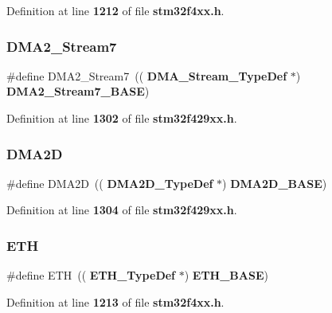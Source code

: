 Definition at line \textbf{ 1212} of file \textbf{ stm32f4xx.\+h}.

\mbox{\label{group__Peripheral__declaration_gacc135dbca0eca67d5aa0abc555f053ce}} 
\subsubsection{D\+M\+A2\+\_\+\+Stream7\hspace{0.1cm}{\footnotesize\ttfamily [2/2]}}
{\footnotesize\ttfamily \#define D\+M\+A2\+\_\+\+Stream7~((\textbf{ D\+M\+A\+\_\+\+Stream\+\_\+\+Type\+Def} $\ast$) \textbf{ D\+M\+A2\+\_\+\+Stream7\+\_\+\+B\+A\+SE})}



Definition at line \textbf{ 1302} of file \textbf{ stm32f429xx.\+h}.

\mbox{\label{group__Peripheral__declaration_ga46ffe4de9c874b15e9adb93a448d0778}} 
\subsubsection{D\+M\+A2D}
{\footnotesize\ttfamily \#define D\+M\+A2D~((\textbf{ D\+M\+A2\+D\+\_\+\+Type\+Def} $\ast$)\textbf{ D\+M\+A2\+D\+\_\+\+B\+A\+SE})}



Definition at line \textbf{ 1304} of file \textbf{ stm32f429xx.\+h}.

\mbox{\label{group__Peripheral__declaration_ga3a3f60de4318afbd0b3318e7a416aadc}} 
\subsubsection{E\+TH\hspace{0.1cm}{\footnotesize\ttfamily [1/2]}}
{\footnotesize\ttfamily \#define E\+TH~((\textbf{ E\+T\+H\+\_\+\+Type\+Def} $\ast$) \textbf{ E\+T\+H\+\_\+\+B\+A\+SE})}



Definition at line \textbf{ 1213} of file \textbf{ stm32f4xx.\+h}.

